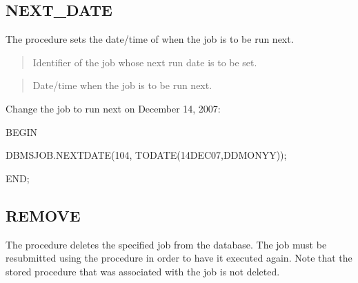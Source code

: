 \documentclass[letterpaper,10pt,english,openany,oneside]{sphinxmanual}
\begin{document}
\newpage


\subsection{NEXT\_DATE}
\label{\detokenize{next_date::doc}}\label{\detokenize{next_date:next-date}}
The  procedure sets the date/time of when the job is to be run
next.



\begin{quote}

Identifier of the job whose next run date is to be set.
\end{quote}

\begin{quote}

Date/time when the job is to be run next.
\end{quote}


Change the job to run next on December 14, 2007:

%
\begin{sphinxVerbatim}[commandchars=\\\{\}]
BEGIN

  DBMS\PYGZus{}JOB.NEXT\PYGZus{}DATE(104, TO\PYGZus{}DATE(\PYGZsq{}14\PYGZhy{}DEC\PYGZhy{}07\PYGZsq{},\PYGZsq{}DD\PYGZhy{}MON\PYGZhy{}YY\PYGZsq{}));

END;
\end{sphinxVerbatim}

\newpage

\ignorespaces 

\subsection{REMOVE}
\label{\detokenize{remove::doc}}\label{\detokenize{remove:index-0}}\label{\detokenize{remove:remove}}
The  procedure deletes the specified job from the database. The
job must be resubmitted using the  procedure in order to have it
executed again. Note that the stored procedure that was associated with
the job is not deleted.
\end{document}
